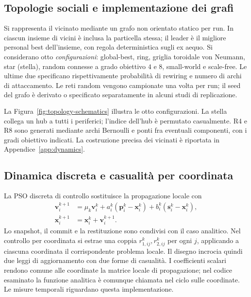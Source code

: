 \subsection{Topologie sociali e implementazione dei grafi}
Si rappresenta il vicinato mediante un grafo non orientato statico per run. In ciascun insieme di vicini \`e inclusa la particella stessa; il leader \`e il migliore personal best dell'insieme, con regola deterministica sugli ex aequo. Si considerano otto \emph{configurazioni}: global-best, ring, griglia toroidale von Neumann, star (stella), random connesse a grado obiettivo $4$ e $8$, small-world e scale-free. Le ultime due specificano rispettivamente probabilit\`a di rewiring e numero di archi di attaccamento. Le reti random vengono campionate una volta per run; il seed del grafo \`e derivato o specificato separatamente in alcuni studi di replicazione.


La Figura~\ref{fig:topology-schematics} illustra le otto configurazioni. La stella collega un hub a tutti i periferici; l'indice dell'hub è permutato casualmente. R4 e R8 sono generati mediante archi Bernoulli e ponti fra eventuali componenti, con i gradi obiettivo indicati. La costruzione precisa dei vicinati è riportata in Appendice~\ref{app:dynamics}.


\subsection{Dinamica discreta e casualità per coordinata}
La PSO discreta di controllo sostituisce la propagazione locale con
\begin{equation}
\begin{aligned}
\bm v_i^{k+1}&=\mu_k\bm v_i^k+a_i^k(\bm p_i^k-\bm x_i^k)
+b_i^k(\bm s_i^k-\bm x_i^k),\\
\bm x_i^{k+1}&=\bm x_i^k+\bm v_i^{k+1}.
\end{aligned}\label{eq:controlled-discrete}
\end{equation}
Lo snapshot, il commit e la restituzione sono condivisi con il caso analitico. Nel controllo per coordinata si estrae una coppia $r_{1,ij}^k,r_{2,ij}^k$ per ogni $j$, applicando a ciascuna coordinata il corrispondente problema locale. Il disegno incrocia quindi due leggi di aggiornamento con due forme di casualità. I coefficienti scalari rendono comune alle coordinate la matrice locale di propagazione; nel codice esaminato la funzione analitica è comunque chiamata nel ciclo sulle coordinate. Le misure temporali riguardano questa implementazione.
